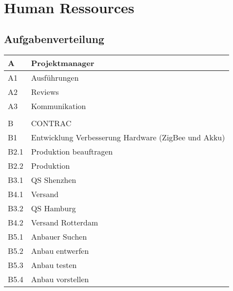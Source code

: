 \section{Human Ressources}
\subsection{Aufgabenverteilung}
\begin{table}[H]
    \renewcommand{\arraystretch}{1.1}
    \begin{center}
        \begin{tabular}{l|l}
            \hline
            A    & Projektmanager                                      \\ \hline
            A1   & Ausführungen                                        \\ \hline
            A2   & Reviews                                             \\ \hline
            A3 & Kommunikation \\\hline
            &                                                   \\ \hline
            B    & CONTRAC                                             \\ \hline
            B1   & Entwicklung Verbesserung Hardware (ZigBee und Akku) \\ \hline
            B2.1 & Produktion beauftragen                              \\ \hline
            B2.2 & Produktion                                          \\ \hline
            B3.1 & QS Shenzhen                                         \\ \hline
            B4.1 & Versand                                             \\ \hline
            B3.2 & QS Hamburg                                          \\ \hline
            B4.2 & Versand Rotterdam                                   \\ \hline
            B5.1 & Anbauer Suchen                                      \\ \hline
            B5.2 & Anbau entwerfen                                     \\ \hline
            B5.3 & Anbau testen                                        \\ \hline
            B5.4 & Anbau vorstellen                                    \\ \hline

\end{tabular}
\end{center}
\end{table}
